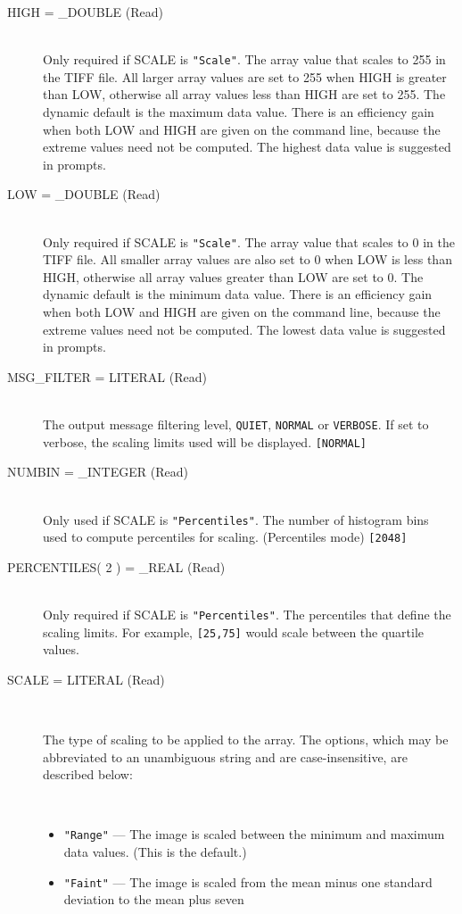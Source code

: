 \documentclass[twoside,11pt]{article}
\newcommand{\latex}[1]{#1}
\newcommand{\sstsubsection}[1]{ \item[{#1}] \mbox{} \\}
\newcommand{\ssthitemlist}[1]{
  \latex{
  \mbox{} \\
  \vspace{-3.5ex}
  }
  \begin{itemize}
     #1
  \end{itemize}
}
\newcommand{\sstitem}{\item}
\newcommand{\sstsubsection}[1]{\item[{#1}]}
\newcommand{\sstitem}{\item}
\begin{document}
{   \begin{description}
      \sstsubsection{
        HIGH = \_DOUBLE (Read)
      }{
        Only required if SCALE is {\texttt{"Scale"}}.
        The array value that scales to 255 in the TIFF file.
        All larger array values are set to 255 when HIGH is greater than
        LOW, otherwise all array values less than HIGH are set to 255.
        The dynamic default is the maximum data value.  There is an
        efficiency gain when both LOW and HIGH are given on the
        command line, because the extreme values need not be computed.
        The highest data value is suggested in prompts.
      }
      \sstsubsection{
        LOW = \_DOUBLE (Read)
      }{
        Only required if SCALE is {\texttt{"Scale"}}.
        The array value that scales to 0 in the TIFF file.
        All smaller array values are also set to 0 when LOW is less than
        HIGH, otherwise all array values greater than LOW are set to 0.
        The dynamic default is the minimum data value.  There is an
        efficiency gain when both LOW and HIGH are given on the
        command line, because the extreme values need not be computed.
        The lowest data value is suggested in prompts.
      }
      \sstsubsection{
        MSG\_FILTER = LITERAL (Read)
      }{
        The output message filtering level, \texttt{QUIET}, \texttt{NORMAL} or
        \texttt{VERBOSE}. If set to verbose, the scaling limits used will be
        displayed. \texttt{[NORMAL]}
      } 
      \sstsubsection{
        NUMBIN  =  \_INTEGER (Read)
      }{
        Only used if SCALE is {\texttt{"Percentiles"}}.
        The number of histogram bins used to compute percentiles for
        scaling. (Percentiles mode) \texttt{[2048]}
      }
      \sstsubsection{
        PERCENTILES( 2 ) = \_REAL (Read)
      }{
        Only required if SCALE is {\texttt{"Percentiles"}}.
        The percentiles that define the scaling limits. For example,
        {\texttt{[25,75]}} would scale between the quartile values.
      }
      \sstsubsection{
         SCALE = LITERAL (Read)
      }{
        The type of scaling to be applied to the array.  The options, which
        may be abbreviated to an unambiguous string and are case-insensitive,
        are described below:
        \ssthitemlist{
           \sstitem
           {\texttt{"Range"}} --- The image is scaled between the minimum and
                          maximum data values. (This is the default.)
           \sstitem
           {\texttt{"Faint"}} --- The image is scaled from the mean minus one
                          standard deviation to the mean plus seven
}}
\end{description}}
\end{document}
